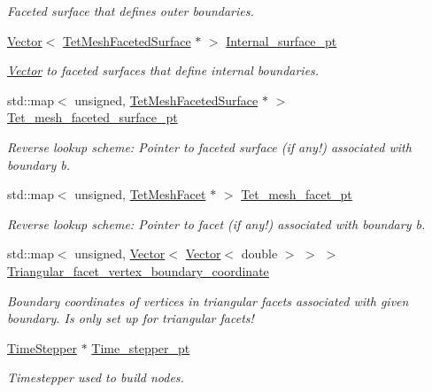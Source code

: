 \begin{DoxyCompactItemize}
\begin{DoxyCompactList}\small\item\em Faceted surface that defines outer boundaries. \end{DoxyCompactList}\item 
\hyperlink{classoomph_1_1Vector}{Vector}$<$ \hyperlink{classoomph_1_1TetMeshFacetedSurface}{Tet\+Mesh\+Faceted\+Surface} $\ast$ $>$ \hyperlink{classoomph_1_1TetMeshBase_a6bcbc45a690d7878c5ca8ccf71165b83}{Internal\+\_\+surface\+\_\+pt}
\begin{DoxyCompactList}\small\item\em \hyperlink{classoomph_1_1Vector}{Vector} to faceted surfaces that define internal boundaries. \end{DoxyCompactList}\item 
std\+::map$<$ unsigned, \hyperlink{classoomph_1_1TetMeshFacetedSurface}{Tet\+Mesh\+Faceted\+Surface} $\ast$ $>$ \hyperlink{classoomph_1_1TetMeshBase_a6d73f6699d303ec13a1f39c97b2e2c27}{Tet\+\_\+mesh\+\_\+faceted\+\_\+surface\+\_\+pt}
\begin{DoxyCompactList}\small\item\em Reverse lookup scheme\+: Pointer to faceted surface (if any!) associated with boundary b. \end{DoxyCompactList}\item 
std\+::map$<$ unsigned, \hyperlink{classoomph_1_1TetMeshFacet}{Tet\+Mesh\+Facet} $\ast$ $>$ \hyperlink{classoomph_1_1TetMeshBase_a31eb99c38149fd9038cfb4f383cfa252}{Tet\+\_\+mesh\+\_\+facet\+\_\+pt}
\begin{DoxyCompactList}\small\item\em Reverse lookup scheme\+: Pointer to facet (if any!) associated with boundary b. \end{DoxyCompactList}\item 
std\+::map$<$ unsigned, \hyperlink{classoomph_1_1Vector}{Vector}$<$ \hyperlink{classoomph_1_1Vector}{Vector}$<$ double $>$ $>$ $>$ \hyperlink{classoomph_1_1TetMeshBase_a293595d36c274c03a1cf8d66d233e5ad}{Triangular\+\_\+facet\+\_\+vertex\+\_\+boundary\+\_\+coordinate}
\begin{DoxyCompactList}\small\item\em Boundary coordinates of vertices in triangular facets associated with given boundary. Is only set up for triangular facets! \end{DoxyCompactList}\item 
\hyperlink{classoomph_1_1TimeStepper}{Time\+Stepper} $\ast$ \hyperlink{classoomph_1_1TetMeshBase_a4cbd314c973492b0f6e50df69075f2a0}{Time\+\_\+stepper\+\_\+pt}
\begin{DoxyCompactList}\small\item\em Timestepper used to build nodes. \end{DoxyCompactList}\end{DoxyCompactItemize}
